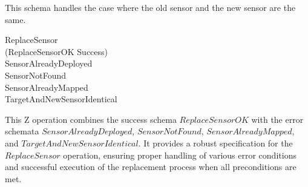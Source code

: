 \documentclass[12pt]{article}
\begin{document}
\begin{spacing}{1.5}
    This schema handles the case where the old sensor and the new sensor are the same.
    
    \begin{zed}
        ReplaceSensor ~\widehat{=} \\
        \indent \quad (ReplaceSensorOK \land Success) \\
        \indent \quad \quad \oplus SensorAlreadyDeployed \\
        \indent \quad \quad \oplus SensorNotFound \\
        \indent \quad \quad \oplus SensorAlreadyMapped \\
        \indent \quad \quad \oplus TargetAndNewSensorIdentical
    \end{zed}

    This Z operation combines the success schema $ReplaceSensorOK$ with the error schemata $SensorAlreadyDeployed$, $SensorNotFound$, $SensorAlreadyMapped$, and $TargetAndNewSensorIdentical$. It provides a robust specification for the $ReplaceSensor$ operation, ensuring proper handling of various error conditions and successful execution of the replacement process when all preconditions are met.


\end{spacing}
\end{document}
